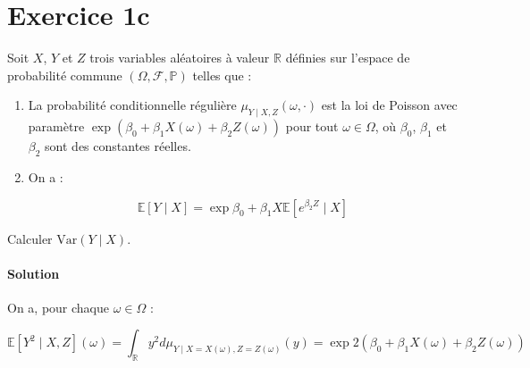 \documentclass[../main.tex]{subfiles}
\begin{document}
\section{Exercice 1c}
\begin{CJK*}{UTF8}{gbsn}
Soit $X$, $Y$ et $Z$ trois variables aléatoires à valeur $\mathbb{R}$ définies sur
l'espace de probabilité commune $(\Omega, \mathcal{F}, \mathbb{P})$ telles que :

\begin{enumerate}
    \item La probabilité conditionnelle régulière $\mu_{Y \mid X, Z}(\omega, \cdot)$ est la loi de Poisson avec paramètre 
    $\exp(\beta_0 + \beta_1 X(\omega) + \beta_2 Z(\omega))$ pour tout $\omega \in \Omega$, 
    où $\beta_0$, $\beta_1$ et $\beta_2$ sont des constantes réelles.
    \item On a :
    
    \begin{equation*}
        \mathbb{E}[Y \mid X] = \exp{\beta_0+\beta_1 X} \mathbb{E}[e^{\beta_2 Z} \mid X]
    \end{equation*}
\end{enumerate}

Calculer $\text{Var}(Y \mid X)$.

\smallskip
\paragraph{Solution}
On a, pour chaque $\omega \in \Omega$ :

\begin{equation*}
    \mathbb{E}[Y^2 \mid X, Z](\omega) = \int_{\mathbb{R}} y^2 d \mu_{Y \mid X = X(\omega), Z = Z(\omega)} (y) = 
    \exp{2(\beta_0 + \beta_1X(\omega) + \beta_2Z(\omega))} 
\end{equation*}
\end{CJK*}
\end{document}
